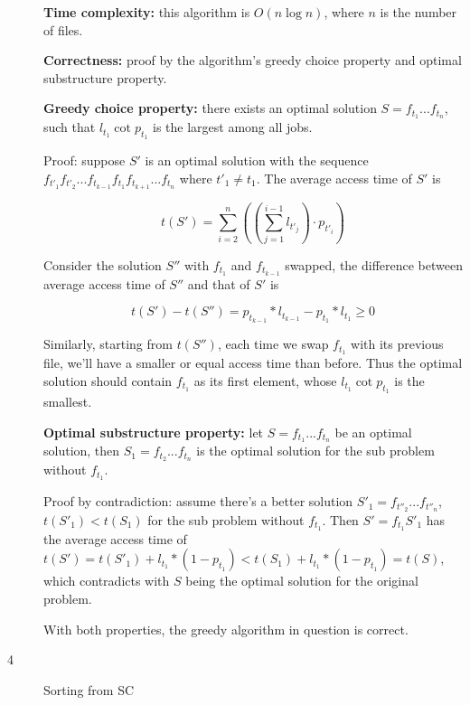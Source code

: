 \documentclass{article}
\begin{document}
\begin{description}
  \textbf{Time complexity:} this algorithm is $O(n \log n)$, where $n$ is the number of files.

  \textbf{Correctness:} proof by the algorithm's greedy choice property and optimal substructure property.

  \textbf{Greedy choice property:} there exists an optimal solution $S=f_{t_1}...f_{t_n}$, such that $l_{t_1} \cot p_{t_1}$ is the largest among all jobs.

  Proof: suppose $S'$ is an optimal solution with the sequence $f_{t'_1}f_{t'_2}...f_{t_{k-1}}f_{t_1}f_{t_{k+1}}...f_{t_n}$ where $t'_1 \neq t_1$. The average access time of $S'$ is 

  $$t(S') = \sum_{i=2}^{n}{((\sum_{j=1}^{i-1}{l_{t'_j}}) \cdot p_{t'_i})}$$

  Consider the solution $S''$ with $f_{t_1}$ and $f_{t_{k-1}}$ swapped, the difference between average access time of $S''$ and that of $S'$ is

  $$t(S') - t(S'') = p_{t_{k-1}} * l_{t_{k-1}} - p_{t_1} * l_{t_1} \geq 0$$

  Similarly, starting from $t(S'')$, each time we swap $f_{t_1}$ with its previous file, we'll have a smaller or equal access time than before. Thus the optimal solution should contain $f_{t_1}$ as its first element, whose $l_{t_1} \cot p_{t_1}$ is the smallest.

  \textbf{Optimal substructure property:} let $S=f_{t_1}...f_{t_n}$ be an optimal solution, then $S_1=f_{t_2}...f_{t_n}$ is the optimal solution for the sub problem without $f_{t_1}$.

  Proof by contradiction: assume there's a better solution $S'_1=f_{t''_2}...f_{t''_n}$, $t(S'_1)<t(S_1)$ for the sub problem without $f_{t_1}$. Then $S'=f_{t_1}S'_1$ has the average access time of $t(S')=t(S'_1) + l_{t_1} * (1-p_{t_1}) < t(S_1) + l_{t_1} * (1-p_{t_1}) = t(S)$, which contradicts with $S$ being the optimal solution for the original problem.

  With both properties, the greedy algorithm in question is correct.

\item[4]{Sorting from SC}
  


\end{description}
\end{document}
